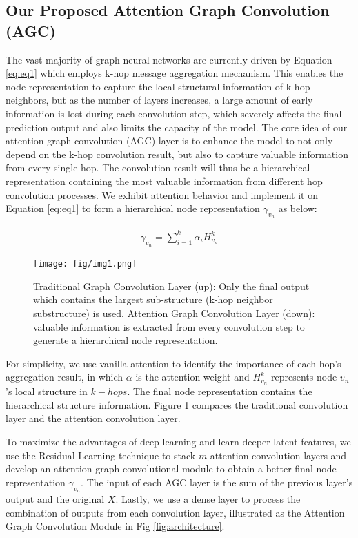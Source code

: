 \documentclass[conference]{IEEEtran}
\begin{document}
	    \subsection{Our Proposed Attention Graph Convolution (AGC)} The vast majority of graph neural networks are currently driven by Equation \ref{eq:eq1} which employs k-hop message aggregation mechanism. This enables the node representation to capture the local structural information of k-hop neighbors, but as the number of layers increases, a large amount of early information is lost during each convolution step, which severely affects the final prediction output and also limits the capacity of the model. The core idea of our attention graph convolution (AGC) layer is to enhance the model to not only depend on the k-hop convolution result, but also to capture valuable information from every single hop. The convolution result will thus be a hierarchical representation containing the most valuable information from different hop convolution processes. We exhibit attention behavior and implement it on Equation \ref{eq:eq1} to form a hierarchical node representation $\gamma_{v_n}$ as below:  

		\begin{eqnarray}
		    \gamma_{v_n} = \sum_{i=1}^{k} \alpha_iH^k_{v_n}
\label{eq:eq2}
		\end{eqnarray}
		
    	\begin{figure}
 	 	\centering
 	 		\texttt{[image: fig/img1.png]}
 	 		\caption{Traditional Graph Convolution Layer (up): Only the final output which contains the largest sub-structure (k-hop neighbor substructure) is used. Attention Graph Convolution Layer (down): valuable information is extracted from every convolution step to generate a hierarchical node representation.}   
 	 	\label{fig:traditional}
		\end{figure}
		
		For simplicity, we use vanilla attention to identify the importance of each hop's aggregation result, in which $\alpha$ is the attention weight and $H^k_{v_n}$ represents node $v_n$'s local structure in $k-hops$. The final node representation contains the hierarchical structure information. Figure \ref{fig:traditional} compares the traditional convolution layer and the attention convolution layer.
		
		To maximize the advantages of deep learning and learn deeper latent features, we use the Residual Learning technique \cite{he2016deep} to stack $m$ attention convolution layers and develop an attention graph convolutional module to obtain a better final node representation $\gamma_{v_n}$.  The input of each AGC layer is the sum of the previous layer's output and the original $X$. Lastly, we use a dense layer to process the combination of outputs from each convolution layer, illustrated as the Attention Graph Convolution Module in Fig \ref{fig:architecture}.
				
\end{document}
